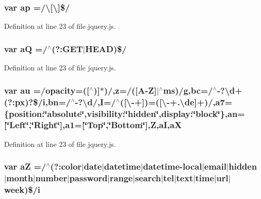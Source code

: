 \subsubsection[{ap}]{\setlength{\rightskip}{0pt plus 5cm}var ap =/\textbackslash{}\mbox{[}\textbackslash{}\mbox{]}\$/}\label{a00039_a6ddf393cc7f9a8828e197bb0d9916c44}


Definition at line 23 of file jquery.\+js.

\hypertarget{a00039_a79eb58dc6cdf0aef563d5dc1ded27df5}{}
\subsubsection[{a\+Q}]{\setlength{\rightskip}{0pt plus 5cm}var a\+Q =/$^\wedge$(?\+:G\+E\+T$\vert$H\+E\+A\+D)\$/}\label{a00039_a79eb58dc6cdf0aef563d5dc1ded27df5}


Definition at line 23 of file jquery.\+js.

\hypertarget{a00039_a4fd8ddfab07c8d7c7cae0ab0e052cad3}{}
\subsubsection[{au}]{\setlength{\rightskip}{0pt plus 5cm}var au =/opacity=(\mbox{[}$^\wedge$)\mbox{]}$\ast$)/,z=/(\mbox{[}A-\/{\bf Z}\mbox{]}$\vert$$^\wedge$ms)/g,bc=/$^\wedge$-\/?\textbackslash{}d+(?\+:px)?\$/i,bn=/$^\wedge$-\/?\textbackslash{}d/,I=/$^\wedge$(\mbox{[}\textbackslash{}-\/+\mbox{]})=(\mbox{[}\textbackslash{}-\/+.\textbackslash{}de\mbox{]}+)/,a7=\{position\+:\char`\"{}absolute\char`\"{},visibility\+:\char`\"{}hidden\char`\"{},display\+:\char`\"{}block\char`\"{}\},an=\mbox{[}\char`\"{}Left\char`\"{},\char`\"{}Right\char`\"{}\mbox{]},a1=\mbox{[}\char`\"{}Top\char`\"{},\char`\"{}Bottom\char`\"{}\mbox{]},Z,a\+I,a\+X}\label{a00039_a4fd8ddfab07c8d7c7cae0ab0e052cad3}


Definition at line 23 of file jquery.\+js.

\hypertarget{a00039_ac87125cdee1a5e57da4ef619af49bc7d}{}
\subsubsection[{a\+Z}]{\setlength{\rightskip}{0pt plus 5cm}var a\+Z =/$^\wedge$(?\+:color$\vert$date$\vert$datetime$\vert$datetime-\/local$\vert$email$\vert$hidden$\vert$month$\vert$number$\vert$password$\vert$range$\vert$search$\vert$tel$\vert$text$\vert$time$\vert$url$\vert$week)\$/i}\label{a00039_ac87125cdee1a5e57da4ef619af49bc7d}


